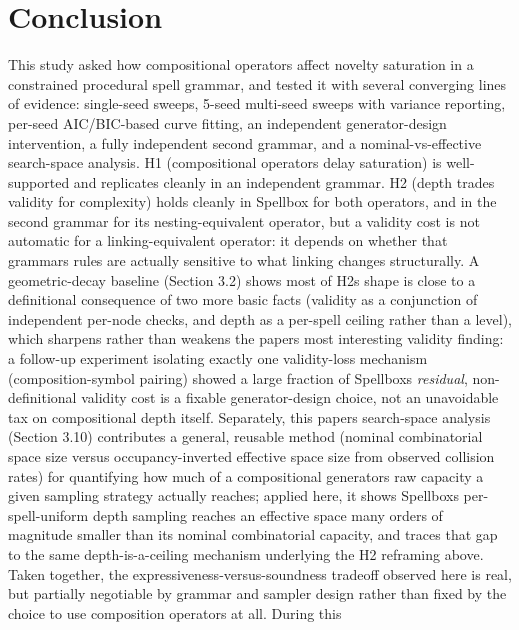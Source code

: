 \documentclass[
  10pt,
  twocolumn]{article}
\begin{document}
\section{Conclusion}\label{conclusion}

This study asked how compositional operators affect novelty saturation
in a constrained procedural spell grammar, and tested it with several
converging lines of evidence: single-seed sweeps, 5-seed multi-seed
sweeps with variance reporting, per-seed AIC/BIC-based curve fitting, an
independent generator-design intervention, a fully independent second
grammar, and a nominal-vs-effective search-space analysis. H1
(compositional operators delay saturation) is well-supported and
replicates cleanly in an independent grammar. H2 (depth trades validity
for complexity) holds cleanly in Spellbox for both operators, and in the
second grammar for its nesting-equivalent operator, but a validity cost
is not automatic for a linking-equivalent operator: it depends on
whether that grammar\textquotesingle s rules are actually sensitive to
what linking changes structurally. A geometric-decay baseline (Section
3.2) shows most of H2\textquotesingle s shape is close to a definitional
consequence of two more basic facts (validity as a conjunction of
independent per-node checks, and depth as a per-spell ceiling rather
than a level), which sharpens rather than weakens the
paper\textquotesingle s most interesting validity finding: a follow-up
experiment isolating exactly one validity-loss mechanism
(composition-symbol pairing) showed a large fraction of
Spellbox\textquotesingle s \emph{residual}, non-definitional validity
cost is a fixable generator-design choice, not an unavoidable tax on
compositional depth itself. Separately, this paper\textquotesingle s
search-space analysis (Section 3.10) contributes a general, reusable
method (nominal combinatorial space size versus occupancy-inverted
effective space size from observed collision rates) for quantifying how
much of a compositional generator\textquotesingle s raw capacity a given
sampling strategy actually reaches; applied here, it shows
Spellbox\textquotesingle s per-spell-uniform depth sampling reaches an
effective space many orders of magnitude smaller than its nominal
combinatorial capacity, and traces that gap to the same
depth-is-a-ceiling mechanism underlying the H2 reframing above. Taken
together, the expressiveness-versus-soundness tradeoff observed here is
real, but partially negotiable by grammar and sampler design rather than
fixed by the choice to use composition operators at all. During this
\end{document}

